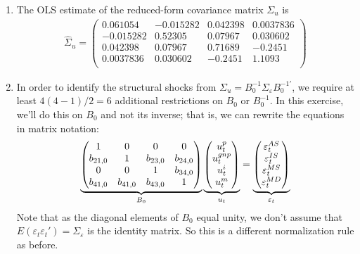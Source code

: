 \begin{enumerate}
\item The OLS estimate of the reduced-form covariance matrix \(\Sigma_{u}\) is
\begin{align*}
\widehat{\Sigma}_u =
\begin{pmatrix}
 0.061054  & -0.015282 &  0.042398 &  0.0037836 \\
-0.015282  &  0.52305  &  0.07967  &  0.030602 \\
 0.042398  &  0.07967  &  0.71689  & -0.2451 \\
 0.0037836 &  0.030602 & -0.2451   &  1.1093 \\
\end{pmatrix} 
\end{align*}

\item In order to identify the structural shocks from \(\Sigma_{u} = B_{0}^{-1} \Sigma_{\varepsilon} B_{0}^{-1'}\),
  we require at least \(4(4-1)/2=6\) additional restrictions on \(B_{0}\) or \(B_{0}^{-1}\).
In this exercise, we'll do this on \(B_{0}\) and not its inverse; that is, we can rewrite the equations in matrix notation:
\begin{align*}
\underbrace{%
  \begin{pmatrix}
  1 & 0 & 0 & 0 \\
  b_{21,0} & 1 & b_{23,0} & b_{24,0} \\
  0 & 0 & 1 & b_{34,0} \\
  b_{41,0} & b_{41,0} & b_{43,0} & 1
  \end{pmatrix}
}_{B_{0}}
\underbrace{%
  \begin{pmatrix}
  u_t^p \\
  u_t^{gnp} \\
  u_t^{i} \\
  u_t^{m}
  \end{pmatrix}
}_{u_t}
=
\underbrace{%
  \begin{pmatrix}
  \varepsilon_t^{AS} \\
  \varepsilon_t^{IS} \\
  \varepsilon_t^{MS} \\
  \varepsilon_t^{MD}
  \end{pmatrix}
}_{\varepsilon_t}
\end{align*}
Note that as the diagonal elements of \(B_{0}\) equal unity, we don't assume that \(E(\varepsilon_t \varepsilon_t')=\Sigma_{\varepsilon} \) is the identity matrix.
So this is a different normalization rule as before.


\end{enumerate}
